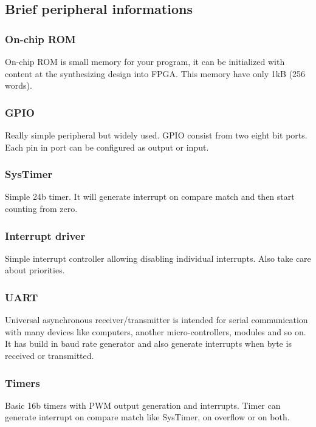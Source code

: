\subsection{Brief peripheral informations}

\subsubsection{On-chip ROM}

On-chip ROM is small memory for your program, it can be initialized with content
 at the synthesizing design into FPGA. This memory have only 1kB (256 words).

\subsubsection{GPIO}

Really simple peripheral but widely used. GPIO consist from two eight bit ports.
 Each pin in port can be configured as output or input.

\subsubsection{SysTimer}

Simple 24b timer. It will generate interrupt on compare match and then start
counting from zero.

\subsubsection{Interrupt driver}

Simple interrupt controller allowing disabling individual interrupts. Also take
care about priorities.

\subsubsection{UART}

Universal asynchronous receiver/transmitter is intended for serial communication
with many devices like computers, another micro-controllers, modules and so on.
It has build in baud rate generator and also generate interrupts when byte is
received or transmitted.

\subsubsection{Timers}

Basic 16b timers with PWM output generation and interrupts. Timer can generate
interrupt on compare match like SysTimer, on overflow or on both.

